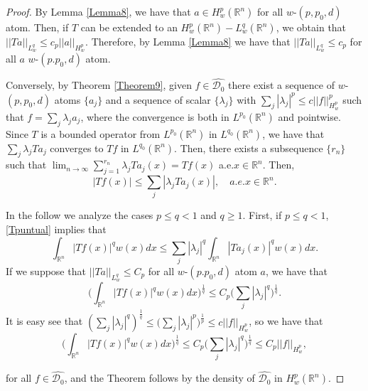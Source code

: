 \documentclass[a4paper,12pt,reqno]{amsart}
\numberwithin{equation}{section}
\begin{document}
	\begin{proof}
		By Lemma \ref{Lemma8}, we have that $a \in H^{p}_w(\mathbb{R}^{n})$ for all $w$-$(p,p_0,d)$ atom. Then, if $T$ can be extended to an $H^{p}_w(\mathbb{R}^{n})-L^{q}_w(\mathbb{R}^{n})$, we obtain that $||Ta||_{L^{q}_w} \leq c_p||a||_{H^{p}_w}$. Therefore, by Lemma \ref{Lemma8} we have that $||Ta||_{L^{q}_w} \leq c_p$ for all $a$ $w$-$(p.p_0,d)$ atom.
		
		Conversely, by Theorem \ref{Theorem9}, given $f \in \hat{\mathcal{D}_0}$ there exist a sequence of $w$-$(p,p_0,d)$ atoms $\{a_j\}$ and a sequence of scalar $\{\lambda_j\}$ with $\sum_j |\lambda_j|^{p} \leq c||f||^{p}_{H^{p}_w}$ such that $f=\sum_j \lambda_ja_j$, where the convergence is both in $L^{p_0}(\mathbb{R}^{n})$ and pointwise. 
		Since $T$ is a bounded operator from $L^{p_0}(\mathbb{R}^{n})$ in $L^{q_0}(\mathbb{R}^{n})$, we have that $\sum_j \lambda_jTa_j$ converges to $Tf$ in $L^{q_0}(\mathbb{R}^{n})$.
		Then, there exists a subsequence $\{r_n\}$ such that $\lim_{n \to \infty} \sum_{j=1}^{r_n} \lambda_j Ta_j(x)=Tf(x)$ a.e.$x \in \mathbb{R}^{n}$.
		Then, 
		\begin{equation}\label{Tpuntual}
			|Tf(x)| \leq \sum_j |\lambda_jTa_j(x)|, \quad a.e.x \in \mathbb{R}^{n}.
		\end{equation}
		
		In the follow we analyze the cases $p\leq q<1$ and $q\geq 1$. First, if $p\leq q<1$, \eqref{Tpuntual} implies that 
		$$ \int_{\mathbb{R}^{n}} |Tf(x)|^{q} w(x) dx \leq \sum_j |\lambda_j|^{q} \int_{\mathbb{R}^{n}} |Ta_j(x)|^{q} w(x) dx.$$
		If we suppose that $||Ta||_{L^{q}_w} \leq C_p$ for all $w$-$(p.p_0,d)$ atom $a$, we have that 
		$$ \Big(\int_{\mathbb{R}^{n}} |Tf(x)|^{q} w(x) dx \Big)^{\frac{1}{q}} \leq C_p \Big(\sum_j |\lambda_j|^{q}\Big)^{\frac{1}{q}}.$$
		It is easy see that $ \left( \sum_j |\lambda_j|^q \right)^{\frac{1}{q}} \leq \Big( \sum_j|\lambda_j|^{p}\Big)^{\frac{1}{p}} \leq c ||f||_{H^{p}_w}$, 
		so we have that 
		$$ \Big(\int_{\mathbb{R}^{n}} |Tf(x)|^{q} w(x) dx \Big)^{\frac{1}{q}} \leq C_p \Big(\sum_j |\lambda_j|^{q}\Big)^{\frac{1}{q}}  \leq C_p ||f||_{H^{p}_w},$$
		
		for all $f \in \hat{\mathcal{D}_0}$, and the Theorem follows by the density of $\hat{\mathcal{D}_0}$ in $H^{p}_w(\mathbb{R}^{n})$.
		

\end{proof}
\end{document}
